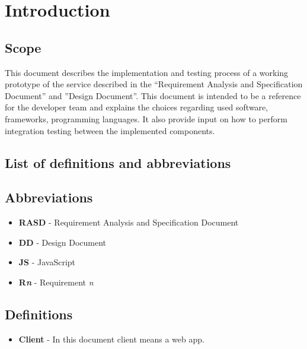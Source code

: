\documentclass[
]{article}
\begin{document}
\hypertarget{introduction}{%
\section{Introduction}\label{introduction}}

\hypertarget{scope}{%
\subsection{Scope}\label{scope}}

This document describes the implementation and testing process of a
working prototype of the service described in the ``Requirement Analysis
and Specification Document'' and ''Design Document''. This document is
intended to be a reference for the developer team and explains the
choices regarding used software, frameworks, programming languages. It
also provide input on how to perform integration testing between the
implemented components.

\hypertarget{list-of-definitions-and-abbreviations}{%
\subsection{List of definitions and
abbreviations}\label{list-of-definitions-and-abbreviations}}

\hypertarget{abbreviations}{%
\subsection{Abbreviations}\label{abbreviations}}

\begin{itemize}
\item
  \textbf{RASD} - Requirement Analysis and Specification Document
\item
  \textbf{DD} - Design Document
\item
  \textbf{JS} - JavaScript
\item
  \textbf{R\emph{n}} - Requirement \emph{n}
\end{itemize}

\hypertarget{definitions}{%
\subsection{Definitions}\label{definitions}}

\begin{itemize}

\item
  \textbf{Client} - In this document client means a web app.
\end{itemize}
\end{document}
